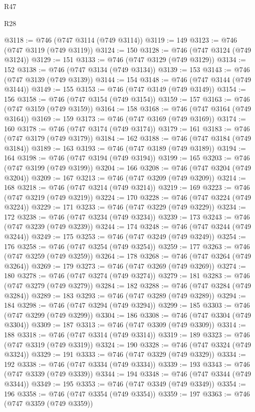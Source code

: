 \begin{lexlean}{R47}
\begin{lexlean}{R28}
\begin{coremodule}
{{{{{{{{{{{{{{{{{{{{{{{{{{{{{{{{{{{{{{{{{{{{{{{{{{{{{{{{{{{{{{{{{{{{{{{{{{{{{{{{{{{{{{{{{{{{{{{{{{{{{{{{{{{{{{{{{{{{{{{{{{{{{{{{{{{{{@3118 := @746 (@747 @3114 (@749 @3114))
@3119 := 149
@3123 := @746 (@747 @3119 (@749 @3119))
@3124 := 150
@3128 := @746 (@747 @3124 (@749 @3124))
@3129 := 151
@3133 := @746 (@747 @3129 (@749 @3129))
@3134 := 152
@3138 := @746 (@747 @3134 (@749 @3134))
@3139 := 153
@3143 := @746 (@747 @3139 (@749 @3139))
@3144 := 154
@3148 := @746 (@747 @3144 (@749 @3144))
@3149 := 155
@3153 := @746 (@747 @3149 (@749 @3149))
@3154 := 156
@3158 := @746 (@747 @3154 (@749 @3154))
@3159 := 157
@3163 := @746 (@747 @3159 (@749 @3159))
@3164 := 158
@3168 := @746 (@747 @3164 (@749 @3164))
@3169 := 159
@3173 := @746 (@747 @3169 (@749 @3169))
@3174 := 160
@3178 := @746 (@747 @3174 (@749 @3174))
@3179 := 161
@3183 := @746 (@747 @3179 (@749 @3179))
@3184 := 162
@3188 := @746 (@747 @3184 (@749 @3184))
@3189 := 163
@3193 := @746 (@747 @3189 (@749 @3189))
@3194 := 164
@3198 := @746 (@747 @3194 (@749 @3194))
@3199 := 165
@3203 := @746 (@747 @3199 (@749 @3199))
@3204 := 166
@3208 := @746 (@747 @3204 (@749 @3204))
@3209 := 167
@3213 := @746 (@747 @3209 (@749 @3209))
@3214 := 168
@3218 := @746 (@747 @3214 (@749 @3214))
@3219 := 169
@3223 := @746 (@747 @3219 (@749 @3219))
@3224 := 170
@3228 := @746 (@747 @3224 (@749 @3224))
@3229 := 171
@3233 := @746 (@747 @3229 (@749 @3229))
@3234 := 172
@3238 := @746 (@747 @3234 (@749 @3234))
@3239 := 173
@3243 := @746 (@747 @3239 (@749 @3239))
@3244 := 174
@3248 := @746 (@747 @3244 (@749 @3244))
@3249 := 175
@3253 := @746 (@747 @3249 (@749 @3249))
@3254 := 176
@3258 := @746 (@747 @3254 (@749 @3254))
@3259 := 177
@3263 := @746 (@747 @3259 (@749 @3259))
@3264 := 178
@3268 := @746 (@747 @3264 (@749 @3264))
@3269 := 179
@3273 := @746 (@747 @3269 (@749 @3269))
@3274 := 180
@3278 := @746 (@747 @3274 (@749 @3274))
@3279 := 181
@3283 := @746 (@747 @3279 (@749 @3279))
@3284 := 182
@3288 := @746 (@747 @3284 (@749 @3284))
@3289 := 183
@3293 := @746 (@747 @3289 (@749 @3289))
@3294 := 184
@3298 := @746 (@747 @3294 (@749 @3294))
@3299 := 185
@3303 := @746 (@747 @3299 (@749 @3299))
@3304 := 186
@3308 := @746 (@747 @3304 (@749 @3304))
@3309 := 187
@3313 := @746 (@747 @3309 (@749 @3309))
@3314 := 188
@3318 := @746 (@747 @3314 (@749 @3314))
@3319 := 189
@3323 := @746 (@747 @3319 (@749 @3319))
@3324 := 190
@3328 := @746 (@747 @3324 (@749 @3324))
@3329 := 191
@3333 := @746 (@747 @3329 (@749 @3329))
@3334 := 192
@3338 := @746 (@747 @3334 (@749 @3334))
@3339 := 193
@3343 := @746 (@747 @3339 (@749 @3339))
@3344 := 194
@3348 := @746 (@747 @3344 (@749 @3344))
@3349 := 195
@3353 := @746 (@747 @3349 (@749 @3349))
@3354 := 196
@3358 := @746 (@747 @3354 (@749 @3354))
@3359 := 197
@3363 := @746 (@747 @3359 (@749 @3359))
}}}}}}}}}}}}}}}}}}}}}}}}}}}}}}}}}}}}}}}}}}}}}}}}}}}}}}}}}}}}}}}}}}}}}}}}}}}}}}}}}}}}}}}}}}}}}}}}}}}}}}}}}}}}}}}}}}}}}}}}}}}}}}}}}}}}}
\end{coremodule}
\end{lexlean}
\end{lexlean}
